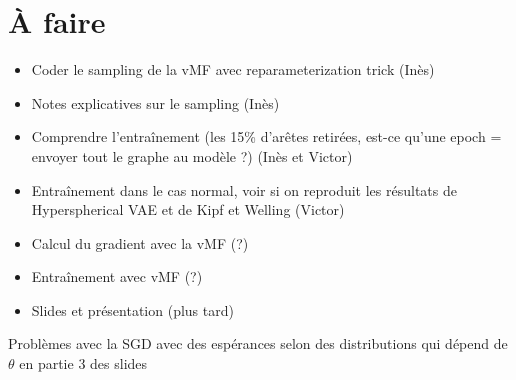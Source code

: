 \documentclass[a4paper]{article}
\begin{document}
	\section{À faire}
	\begin{itemize}
		\item Coder le sampling de la vMF avec reparameterization trick (Inès)
		\item Notes explicatives sur le sampling (Inès)
		\item Comprendre l'entraînement (les 15\% d'arêtes retirées, est-ce qu'une epoch = envoyer tout le graphe au modèle ?) (Inès et Victor)
		\item Entraînement dans le cas normal, voir si on reproduit les résultats de Hyperspherical VAE et de Kipf et Welling (Victor)
		\item Calcul du gradient avec la vMF (?)
		\item Entraînement avec vMF (?)
		\item Slides et présentation (plus tard)
	\end{itemize}

	Problèmes avec la SGD avec des espérances selon des distributions qui dépend de $\theta$ en partie 3 des slides
\end{document}
